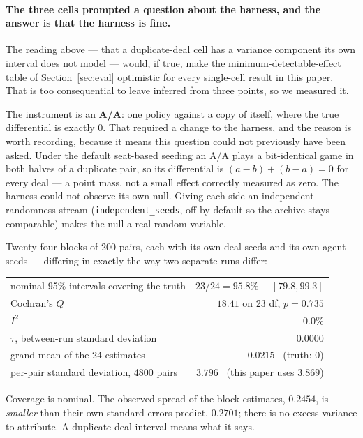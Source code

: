 \documentclass[11pt,a4paper]{article}
\begin{document}
\paragraph{The three cells prompted a question about the harness, and the
answer is that the harness is fine.} The reading above --- that a duplicate-deal
cell has a variance component its own interval does not model --- would, if true,
make the minimum-detectable-effect table of Section~\ref{sec:eval} optimistic for
every single-cell result in this paper. That is too consequential to leave
inferred from three points, so we measured it.

The instrument is an \textbf{A/A}: one policy against a copy of itself, where the
true differential is exactly $0$. That required a change to the harness, and the
reason is worth recording, because it means this question could not previously
have been asked. Under the default seat-based seeding an A/A plays a
bit-identical game in both halves of a duplicate pair, so its differential is
$(a-b) + (b-a) = 0$ for every deal --- a point mass, not a small effect correctly
measured as zero. The harness could not observe its own null. Giving each side an
independent randomness stream (\texttt{independent\_seeds}, off by default so the
archive stays comparable) makes the null a real random variable.

Twenty-four blocks of 200 pairs, each with its own deal seeds and its own agent
seeds --- differing in exactly the way two separate runs differ:

\begin{center}
\begin{tabular}{lr}
\toprule
nominal 95\% intervals covering the truth & $23/24 = 95.8\%$ \ \ $[79.8, 99.3]$ \\
Cochran's $Q$ & $18.41$ on 23 df, $p = 0.735$ \\
$I^2$ & $0.0\%$ \\
$\tau$, between-run standard deviation & $\mathbf{0.0000}$ \\
grand mean of the 24 estimates & $-0.0215$ \ (truth: $0$) \\
per-pair standard deviation, 4800 pairs & $3.796$ \ (this paper uses $3.869$) \\
\bottomrule
\end{tabular}
\end{center}

Coverage is nominal. The observed spread of the block estimates, $0.2454$, is
\emph{smaller} than their own standard errors predict, $0.2701$; there is no
excess variance to attribute. A duplicate-deal interval means what it says.
\end{document}
